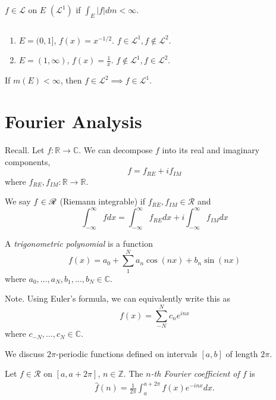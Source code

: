 \documentclass[11pt]{article}
\begin{document}
\begin{remark} $f \in \mathscr{L}$ on $E$ $(\mathscr{L}^1)$ if $\int_E |f| dm < \infty$.
\end{remark}

\begin{example} $\text{}$
  \begin{enumerate}
  \item $E = (0, 1]$, $f(x) = x^{-1/2}$. $f \in \mathscr{L}^1, f \notin \mathscr{L}^2$.
  \item $E = (1, \infty)$, $f(x) = \frac{1}{x}$. $f \notin \mathscr{L}^1, f \in \mathscr{L}^2$.
  \end{enumerate}
\end{example}

\begin{theorem} If $m(E) < \infty$, then $f \in \mathscr{L}^2 \implies f \in \mathscr{L}^1$.
\end{theorem}

\newpage 

\section{Fourier Analysis}

Recall. Let $f: \mathbb{R} \to \mathbb{C}$. We can decompose $f$ into its real and imaginary components, $$f = f_{RE} + i f_{IM}$$where $f_{RE}, f_{IM}: \mathbb{R} \to \mathbb{R}$.

We say $f \in \mathscr{R}$ (Riemann integrable) if $f_{RE}, f_{IM} \in \mathscr{R}$ and $$\int_{- \infty}^\infty f dx = \int_{- \infty}^\infty f_{RE} dx + i \int_{-\infty}^\infty f_{IM} dx$$

\begin{definition} A \emph{trigonometric polynomial} is a function $$f(x) = a_0 + \sum_1^N a_n \cos (nx) + b_n \sin (nx)$$ where $a_0, \dots, a_N, b_1, \dots, b_N \in \mathbb{C}$.
\end{definition}

Note. Using Euler's formula, we can equivalently write this as $$f(x) = \sum_{-N}^N c_n e^{inx}$$ where $c_{-N}, \dots, c_N \in \mathbb{C}$.

We discuss $2\pi$-periodic functions defined on intervals $[a, b]$ of length $2\pi$.

\begin{definition} Let $f \in \mathscr{R}$ on $[a, a + 2\pi]$, $n \in \mathbb{Z}$. The \emph{$n$-th Fourier coefficient of $f$} is \begin{align*} \hat{f} (n) = \frac{1}{2\pi} \int_a^{a + 2\pi} f(x) e^{-inx} dx.
\end{align*}
\end{definition}
\end{document}
